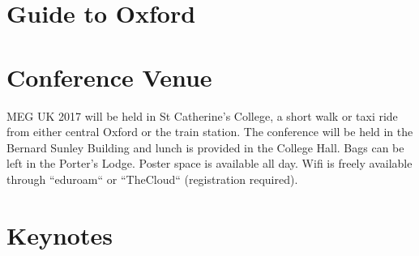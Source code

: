 \documentclass[12pt,a4paper]{article}
\begin{document}

\pagebreak


\section*{Guide to Oxford}
\begin{sideways}
\scalebox{0.95}{

}
\end{sideways}
\thispagestyle{empty}
\restoregeometry

\section*{Conference Venue}

MEG UK 2017 will be held in St Catherine's College, a short walk or taxi ride from either central Oxford or the train station. The conference will be held in the Bernard Sunley Building and lunch is provided in the College Hall. Bags can be left in the Porter's Lodge. Poster space is available all day. Wifi is freely available through ``eduroam`` or ``TheCloud`` (registration required).\\

{\centering
\scalebox{.8}{

}
}

\pagebreak

\section*{Keynotes}
\end{document}
